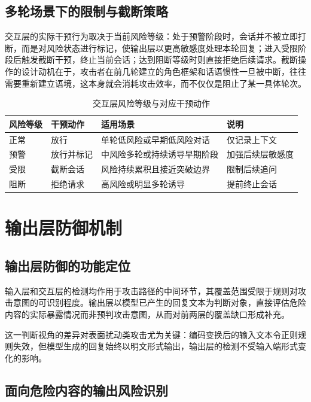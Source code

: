 \subsection{多轮场景下的限制与截断策略}

交互层的实际干预行为取决于当前风险等级：处于预警阶段时，会话并不被立即打断，而是对风险状态进行标记，使输出层以更高敏感度处理本轮回复；进入受限阶段后触发截断干预，终止当前会话；达到阻断等级时则直接拒绝后续请求。截断操作的设计动机在于，攻击者在前几轮建立的角色框架和话语惯性一旦被中断，往往需要重新建立语境，这本身就会消耗攻击效率，而不仅仅是阻止了某一具体轮次。

\begin{table}[H]
\centering
\footnotesize
\setlength{\tabcolsep}{8pt}
\renewcommand{\arraystretch}{1.1}
\caption{交互层风险等级与对应干预动作}
\begin{tabular}{llll}
\toprule
\textbf{风险等级} & \textbf{干预动作} & \textbf{适用场景} & \textbf{说明} \\
\midrule
正常 & 放行 & 单轮低风险或早期低风险对话 & 仅记录上下文 \\
预警 & 放行并标记 & 中风险多轮或持续诱导早期阶段 & 加强后续层敏感度 \\
受限 & 截断会话 & 风险持续累积且接近突破边界 & 限制后续追问 \\
阻断 & 拒绝请求 & 高风险或明显多轮诱导 & 提前终止会话 \\
\bottomrule
\end{tabular}
\end{table}

\section{输出层防御机制}

\subsection{输出层防御的功能定位}

输入层和交互层的检测均作用于攻击路径的中间环节，其覆盖范围受限于规则对攻击意图的可识别程度。输出层以模型已产生的回复文本为判断对象，直接评估危险内容的实际暴露情况而非预判攻击意图，从而对前两层的覆盖缺口形成补充\cite{markov2022holistic,phute2024llmselfdefense}。

这一判断视角的差异对表面扰动类攻击尤为关键：编码变换后的输入文本令正则规则失效，但模型生成的回复始终以明文形式输出，输出层的检测不受输入端形式变化的影响。

\subsection{面向危险内容的输出风险识别}

